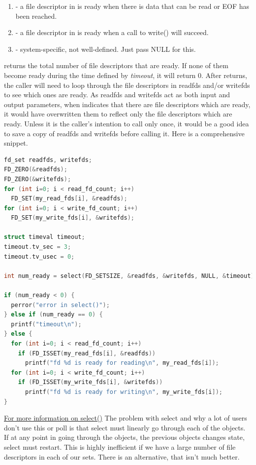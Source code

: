 \begin{enumerate}
\item {} - a file descriptor in  is ready when there is data that can be read or EOF has been reached.

\item {} - a file descriptor in  is ready when a call to write() will succeed.

\item {} - system-specific, not well-defined.
  Just pass NULL for this.
\end{enumerate}

 returns the total number of file descriptors that are ready.
If none of them become ready during the time defined by \emph{timeout}, it will return 0.
After  returns, the caller will need to loop through the file descriptors in readfds and/or writefds to see which ones are ready.
As readfds and writefds act as both input and output parameters, when  indicates that there are file descriptors which are ready, it would have overwritten them to reflect only the file descriptors which are ready.
Unless it is the caller's intention to call  only once, it would be a good idea to save a copy of readfds and writefds before calling it.
Here is a comprehensive snippet.

\begin{lstlisting}[language=C]
fd_set readfds, writefds;
FD_ZERO(&readfds);
FD_ZERO(&writefds);
for (int i=0; i < read_fd_count; i++)
  FD_SET(my_read_fds[i], &readfds);
for (int i=0; i < write_fd_count; i++)
  FD_SET(my_write_fds[i], &writefds);

struct timeval timeout;
timeout.tv_sec = 3;
timeout.tv_usec = 0;

int num_ready = select(FD_SETSIZE, &readfds, &writefds, NULL, &timeout);

if (num_ready < 0) {
  perror("error in select()");
} else if (num_ready == 0) {
  printf("timeout\n");
} else {
  for (int i=0; i < read_fd_count; i++)
    if (FD_ISSET(my_read_fds[i], &readfds))
      printf("fd %d is ready for reading\n", my_read_fds[i]);
  for (int i=0; i < write_fd_count; i++)
    if (FD_ISSET(my_write_fds[i], &writefds))
      printf("fd %d is ready for writing\n", my_write_fds[i]);
}
\end{lstlisting}

\href{http://pubs.opengroup.org/onlinepubs/9699919799/functions/select.html}{For more information on select()}
The problem with select and why a lot of users don't use this or poll is that select must linearly go through each of the objects.
If at any point in going through the objects, the previous objects changes state, select must restart.
This is highly inefficient if we have a large number of file descriptors in each of our sets.
There is an alternative, that isn't much better.

